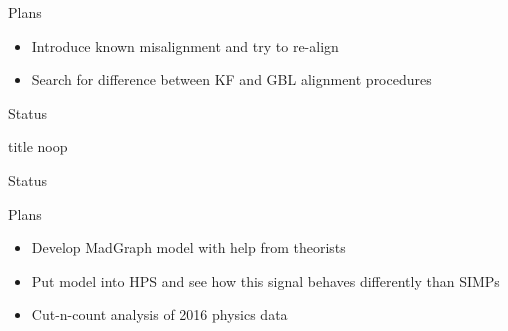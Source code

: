 \documentclass[aspectratio=169]{beamer}
\begin{document}
\begin{frame}{Plans}
  \begin{itemize}
    \item Introduce known misalignment and try to re-align
    \item Search for difference between KF and GBL alignment procedures
  \end{itemize}
\end{frame}


\begin{frame}{Status}
  \vfill
  \centering
  \begin{beamercolorbox}[sep=8pt,center,shadow=true,rounded=true]{title}
      noop\par%
  \end{beamercolorbox}
  \vfill
\end{frame}

\begin{frame}{Status}
  \begin{figure}
    \centering
  \end{figure}
\end{frame}

\begin{frame}{Plans}
  \begin{itemize}
    \item Develop {\sc MadGraph} model with help from theorists
    \item Put model into HPS and see how this signal behaves differently than SIMPs
    \item Cut-n-count analysis of 2016 physics data
  \end{itemize}
\end{frame}
\end{document}
